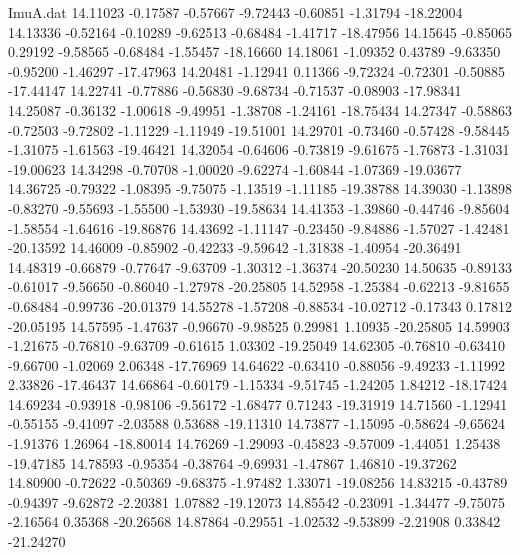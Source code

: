 \begin{filecontents}{ImuA.dat}
  14.11023   -0.17587   -0.57667   -9.72443   -0.60851   -1.31794  -18.22004
  14.13336   -0.52164   -0.10289   -9.62513   -0.68484   -1.41717  -18.47956
  14.15645   -0.85065    0.29192   -9.58565   -0.68484   -1.55457  -18.16660
  14.18061   -1.09352    0.43789   -9.63350   -0.95200   -1.46297  -17.47963
  14.20481   -1.12941    0.11366   -9.72324   -0.72301   -0.50885  -17.44147
  14.22741   -0.77886   -0.56830   -9.68734   -0.71537   -0.08903  -17.98341
  14.25087   -0.36132   -1.00618   -9.49951   -1.38708   -1.24161  -18.75434
  14.27347   -0.58863   -0.72503   -9.72802   -1.11229   -1.11949  -19.51001
  14.29701   -0.73460   -0.57428   -9.58445   -1.31075   -1.61563  -19.46421
  14.32054   -0.64606   -0.73819   -9.61675   -1.76873   -1.31031  -19.00623
  14.34298   -0.70708   -1.00020   -9.62274   -1.60844   -1.07369  -19.03677
  14.36725   -0.79322   -1.08395   -9.75075   -1.13519   -1.11185  -19.38788
  14.39030   -1.13898   -0.83270   -9.55693   -1.55500   -1.53930  -19.58634
  14.41353   -1.39860   -0.44746   -9.85604   -1.58554   -1.64616  -19.86876
  14.43692   -1.11147   -0.23450   -9.84886   -1.57027   -1.42481  -20.13592
  14.46009   -0.85902   -0.42233   -9.59642   -1.31838   -1.40954  -20.36491
  14.48319   -0.66879   -0.77647   -9.63709   -1.30312   -1.36374  -20.50230
  14.50635   -0.89133   -0.61017   -9.56650   -0.86040   -1.27978  -20.25805
  14.52958   -1.25384   -0.62213   -9.81655   -0.68484   -0.99736  -20.01379
  14.55278   -1.57208   -0.88534  -10.02712   -0.17343    0.17812  -20.05195
  14.57595   -1.47637   -0.96670   -9.98525    0.29981    1.10935  -20.25805
  14.59903   -1.21675   -0.76810   -9.63709   -0.61615    1.03302  -19.25049
  14.62305   -0.76810   -0.63410   -9.66700   -1.02069    2.06348  -17.76969
  14.64622   -0.63410   -0.88056   -9.49233   -1.11992    2.33826  -17.46437
  14.66864   -0.60179   -1.15334   -9.51745   -1.24205    1.84212  -18.17424
  14.69234   -0.93918   -0.98106   -9.56172   -1.68477    0.71243  -19.31919
  14.71560   -1.12941   -0.55155   -9.41097   -2.03588    0.53688  -19.11310
  14.73877   -1.15095   -0.58624   -9.65624   -1.91376    1.26964  -18.80014
  14.76269   -1.29093   -0.45823   -9.57009   -1.44051    1.25438  -19.47185
  14.78593   -0.95354   -0.38764   -9.69931   -1.47867    1.46810  -19.37262
  14.80900   -0.72622   -0.50369   -9.68375   -1.97482    1.33071  -19.08256
  14.83215   -0.43789   -0.94397   -9.62872   -2.20381    1.07882  -19.12073
  14.85542   -0.23091   -1.34477   -9.75075   -2.16564    0.35368  -20.26568
  14.87864   -0.29551   -1.02532   -9.53899   -2.21908    0.33842  -21.24270

\end{filecontents}
